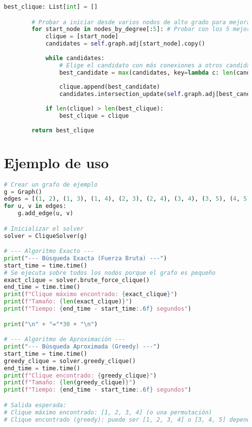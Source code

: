 \documentclass[12pt,a4paper]{report}
\begin{document}
\begin{lstlisting}[language=Python,caption={Solver de cliques en Python}]
        best_clique: List[int] = []

        # Probar a iniciar desde varios nodos de alto grado para mejorar la calidad
        for start_node in nodes_by_degree[:5]: # Probar con los 5 mejores
            clique = [start_node]
            candidates = self.graph.adj[start_node].copy()
            
            while candidates:
                # Elige el candidato con más conexiones a otros candidatos
                best_candidate = max(candidates, key=lambda c: len(candidates.intersection(self.graph.adj[c])))
                
                clique.append(best_candidate)
                candidates.intersection_update(self.graph.adj[best_candidate])
            
            if len(clique) > len(best_clique):
                best_clique = clique
                
        return best_clique
\end{lstlisting}

\section{Ejemplo de uso}
\begin{lstlisting}[language=Python,caption={Ejemplo de uso del solver}]
# Crear un grafo de ejemplo
g = Graph()
edges = [(1, 2), (1, 3), (1, 4), (2, 3), (2, 4), (3, 4), (3, 5), (4, 5)]
for u, v in edges:
    g.add_edge(u, v)

# Inicializar el solver
solver = CliqueSolver(g)

# --- Algoritmo Exacto ---
print("--- Búsqueda Exacta (Fuerza Bruta) ---")
start_time = time.time()
# Se ejecuta sobre todos los nodos porque el grafo es pequeño
exact_clique = solver.brute_force_clique()
end_time = time.time()
print(f"Clique máximo encontrado: {exact_clique}")
print(f"Tamaño: {len(exact_clique)}")
print(f"Tiempo: {end_time - start_time:.6f} segundos")

print("\n" + "="*30 + "\n")

# --- Algoritmo de Aproximación ---
print("--- Búsqueda Aproximada (Greedy) ---")
start_time = time.time()
greedy_clique = solver.greedy_clique()
end_time = time.time()
print(f"Clique encontrado: {greedy_clique}")
print(f"Tamaño: {len(greedy_clique)}")
print(f"Tiempo: {end_time - start_time:.6f} segundos")

# Salida esperada:
# Clique máximo encontrado: [1, 2, 3, 4] (o una permutación)
# Clique encontrado (greedy): puede ser [1, 2, 3, 4] o [3, 4, 5] dependiendo de la heurística
\end{lstlisting}
\end{document}
